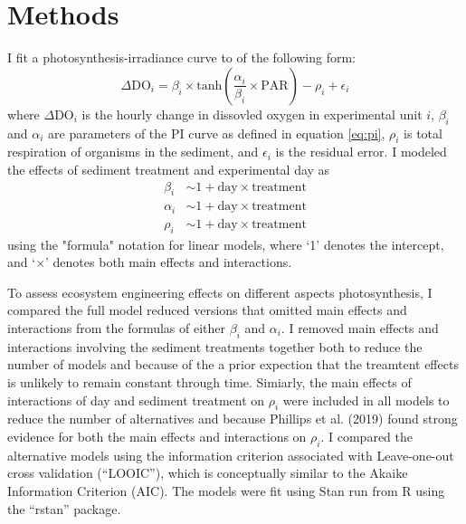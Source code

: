 

\section*{Methods}

I fit a photosynthesis-irradiance curve to of the following form:
%
\begin{equation} \label{eq:fit}
  \Delta \text{DO}_i = 
    \beta_i \times \text{tanh}\left(\frac{\alpha_i} {\beta_i} \times \text{PAR}\right)
      - \rho_i + \epsilon_i
\end{equation}
%
where $\Delta \text{DO}_i$ is the hourly change in dissovled oxygen 
in experimental unit $i$, 
$\beta_i$ and $\alpha_i$ are parameters of the PI curve as defined in equation \ref{eq:pi},
$\rho_i$ is total respiration of organisms in the sediment,
and $\epsilon_i$ is the residual error.
I modeled the effects of sediment treatment and experimental day as
%
\begin{equation} \label{eq:lm}
\begin{split}
\beta_i &\sim 1 + \text{day} \times \text{treatment} \\
\alpha_i &\sim 1 + \text{day} \times \text{treatment} \\
\rho_i &\sim 1 + \text{day} \times \text{treatment}
\end{split}
\end{equation}
%
using the "formula" notation for linear models, 
where `1' denotes the intercept,
and `$\times$' denotes both main effects and interactions.

To assess ecosystem engineering effects on different aspects photosynthesis, 
I compared the full model reduced versions that omitted main effects and interactions from
the formulas of either $\beta_i$ and $\alpha_i$.
I removed main effects and interactions involving the sediment treatments together
both to reduce the number of models and because of the a prior expection that 
the treamtent effects is unlikely to remain constant through time.
Simiarly, the main effects of interactions of day and sediment treatment on $\rho_i$
were included in all models to reduce the number of alternatives and because 
Phillips et al. (2019) found strong evidence for both the main effects and interactions on
$\rho_i$.
I compared the alternative models using the information criterion associated 
with Leave-one-out cross validation (``LOOIC''), 
which is conceptually similar to the  Akaike Information Criterion (AIC).
The models were fit using Stan run from R using the ``rstan'' package.

